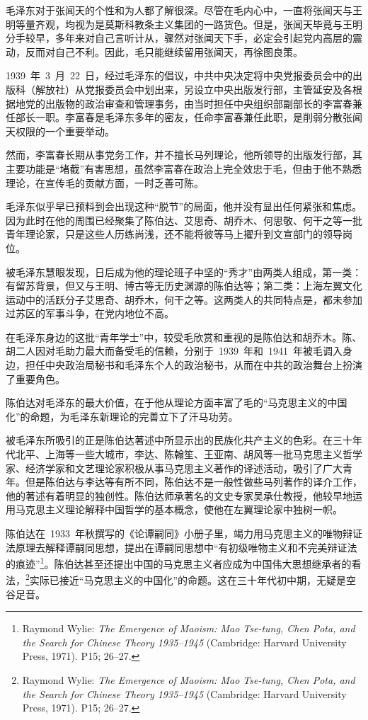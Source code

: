毛泽东对于张闻天的个性和为人都了解很深。尽管在毛内心中，一直将张闻天与王明等量齐观，均视为是莫斯科教条主义集团的一路货色。但是，张闻天毕竟与王明分手较早，多年来对自己言听计从，骤然对张闻天下手，必定会引起党内高层的震动，反而对自己不利。因此，毛只能继续留用张闻天，再徐图良策。

1939~年~3~月~22~日，经过毛泽东的倡议，中共中央决定将中央党报委员会中的出版科（解放社）从党报委员会中划出来，另设立中央出版发行部，主管延安及各根据地党的出版物的政治审查和管理事务，由当时担任中央组织部副部长的李富春兼任部长一职。李富春是毛泽东多年的密友，任命李富春兼任此职，是削弱分散张闻天权限的一个重要举动。

然而，李富春长期从事党务工作，并不擅长马列理论，他所领导的出版发行部，其主要功能是“堵截”有害思想，虽然李富春在政治上完全效忠于毛，但由于他不熟悉理论，在宣传毛的贡献方面，一时乏善可陈。

毛泽东似乎早已预料到会出现这种“脱节”的局面，他并没有显出任何紧张和焦虑。因为此时在他的周围已经聚集了陈伯达、艾思奇、胡乔木、何思敬、何干之等一批青年理论家，只是这些人历练尚浅，还不能将彼等马上擢升到文宣部门的领导岗位。

被毛泽东慧眼发现，日后成为他的理论班子中坚的“秀才”由两类人组成，第一类：有留苏背景，但又与王明、博古等无历史渊源的陈伯达等；第二类：上海左翼文化运动中的活跃分子艾思奇、胡乔木，何干之等。这两类人的共同特点是，都未参加过苏区的军事斗争，在党内地位不高。

在毛泽东身边的这批“青年学士”中，较受毛欣赏和重视的是陈伯达和胡乔木。陈、胡二人因对毛助力最大而备受毛的信赖，分别于~1939~年和~1941~年被毛调入身边，担任中央政治局秘书和毛泽东个人的政治秘书，从而在中共的政治舞台上扮演了重要角色。

陈伯达对毛泽东的最大价值，在于他从理论方面丰富了毛的“马克思主义的中国化”的命题，为毛泽东新理论的完善立下了汗马功劳。

被毛泽东所吸引的正是陈伯达著述中所显示出的民族化共产主义的色彩。在三十年代北平、上海等一些大城市，李达、陈翰笙、王亚南、胡风等一批马克思主义哲学家、经济学家和文艺理论家积极从事马克思主义著作的译述活动，吸引了广大青年。但是陈伯达与李达等有所不同，陈伯达不是一般性做些马列著作的译介工作，他的著述有着明显的独创性。陈伯达师承著名的文史专家吴承仕教授，他较早地运用马克思主义理论解释中国哲学的基本概念，使他在左翼理论家中独树一帜。

陈伯达在~1933~年秋撰写的《论谭嗣同》小册子里，竭力用马克思主义的唯物辩证法原理去解释谭嗣同思想，提出在谭嗣同思想中“有初级唯物主义和不完美辩证法的痕迹”\footnote{Raymond Wylie: \textit{The Emergence of Maoism: Mao Tse-tung, Chen Pota, and the Search for Chinese Theory 1935--1945} (Cambridge: Harvard University Press, 1971). P15; 26--27.}。陈伯达甚至还提出中国的马克思主义者应成为中国伟大思想继承者的看法，\footnote{Raymond Wylie: \textit{The Emergence of Maoism: Mao Tse-tung, Chen Pota, and the Search for Chinese Theory 1935--1945} (Cambridge: Harvard University Press, 1971). P15; 26--27.}实际已接近“马克思主义的中国化”的命题。这在三十年代初中期，无疑是空谷足音。

